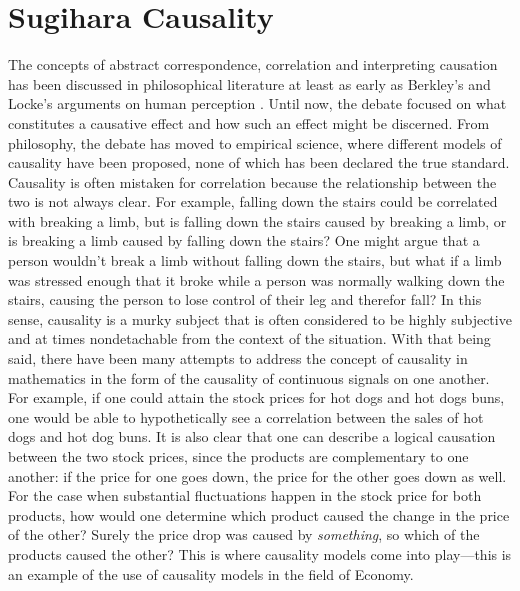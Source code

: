\section{Sugihara Causality}
The concepts of abstract correspondence, correlation and interpreting causation has been discussed in philosophical literature at least as early as Berkley's and Locke's arguments on human perception \cite{Locke1841} \cite{Berkeley1874}. Until now, the debate focused on what constitutes a causative effect and how such an effect might be discerned. From philosophy, the debate has moved to empirical science, where different models of causality have been proposed, none of which has been declared the true standard. Causality is often mistaken for correlation because the relationship between the two is not always clear. For example, falling down the stairs could be correlated with breaking a limb, but is falling down the stairs caused by breaking a limb, or is breaking a limb caused by falling down the stairs? One might argue that a person wouldn't break a limb without falling down the stairs, but what if a limb was stressed enough that it broke while a person was normally walking down the stairs, causing the person to lose control of their leg and therefor fall? In this sense, causality is a murky subject that is often considered to be highly subjective and at times nondetachable from the context of the situation. With that being said, there have been many attempts to address the concept of causality in mathematics in the form of the causality of continuous signals on one another. For example, if one could attain the stock prices for hot dogs and hot dogs buns, one would be able to hypothetically see a correlation between the sales of hot dogs and hot dog buns. It is also clear that one can describe a logical causation between the two stock prices, since the products are complementary to one another: if the price for one goes down, the price for the other goes down as well. For the case when substantial fluctuations happen in the stock price for both products, how would one determine which product caused the change in the price of the other? Surely the price drop was caused by \textit{something}, so which of the products caused the other? This is where causality models come into play---this is an example of the use of causality models in the field of Economy.

